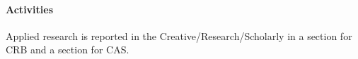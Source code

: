 \paragraph{Activities}

Applied research is reported  in the Creative/Research/Scholarly in a section for CRB and a section for CAS.
\begin{comment}
\paragraph{Plans for 15JUN21-14JUN22}

I plan to continue providing control recommendations for invasive insect species when control methods are available.

I will continue with applied research on CAS and CRB in an effort to mitigate the major damage being done by these pests.

\paragraph{Plans for 15JUN22-14JUN23}

I plan to continue providing control recommendations for invasive insect species when control methods are available.

I will continue with applied research on CAS and CRB in an effort to mitigate the major damage being done by these pests.
\end{comment}
